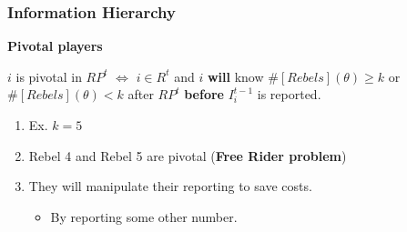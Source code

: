 \documentclass[10pt]{beamer}
\begin{document}
\begin{frame}
  \frametitle{Information Hierarchy}

\textbf{Pivotal players}

\begin{definition}
$i$ is pivotal in $RP^t$ $\Leftrightarrow$ $i\in R^t$ and $i$ \textbf{will} know $\#[Rebels](\theta)\geq k$ or $\#[Rebels](\theta)< k$ after $RP^t$ \textbf{before} $I^{t-1}_i$ is reported.
\end{definition}

\begin{enumerate}
\item Ex. $k=5$
\item Rebel 4 and Rebel 5 are pivotal (\textbf{Free Rider problem})
\begin{center}
\end{center}

\item They will manipulate their reporting to save costs.
\begin{itemize}
\item By reporting some other number.
\end{itemize}
\end{enumerate}



\end{frame}
\end{document}
